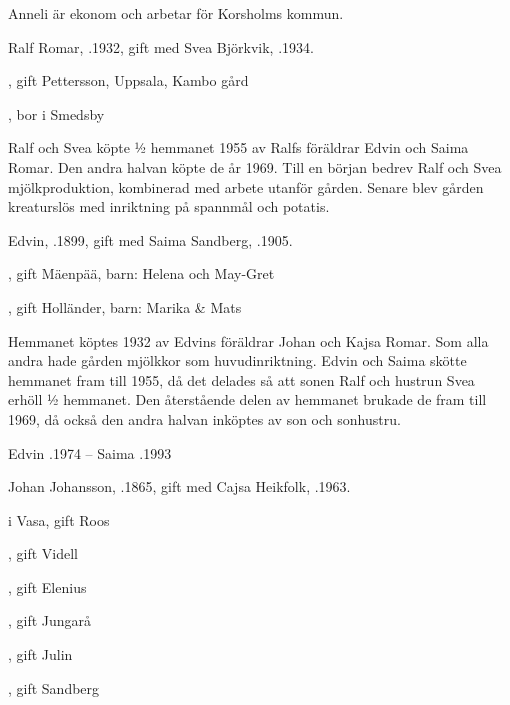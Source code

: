 Anneli är  ekonom och arbetar för Korsholms kommun.





Ralf Romar, .1932, gift med Svea Björkvik, .1934.
\begin{jhchildren}
  \item {}, gift Pettersson, Uppsala, Kambo gård
  \item {}, bor i Smedsby
\end{jhchildren}

Ralf och Svea köpte  ½ hemmanet 1955 av Ralfs föräldrar Edvin och Saima Romar. Den andra halvan köpte de  år 1969. Till en början bedrev Ralf och Svea mjölkproduktion, kombinerad med arbete utanför gården. Senare blev gården kreaturslös med inriktning på spannmål och potatis.



Edvin, .1899, gift med Saima Sandberg, .1905.
\begin{jhchildren}
  \item {}, gift Mäenpää, barn: Helena och May-Gret
  \item {}
  \item {}, gift Holländer, barn: Marika \& Mats
\end{jhchildren}

Hemmanet köptes  1932  av Edvins föräldrar Johan och Kajsa Romar. Som alla andra hade gården mjölkkor som huvudinriktning. Edvin och Saima skötte hemmanet fram till 1955, då det delades så att sonen Ralf och hustrun Svea erhöll ½ hemmanet.  Den återstående delen av hemmanet brukade de fram till 1969, då också den andra halvan inköptes av son och sonhustru.

Edvin .1974  --  Saima .1993



Johan Johansson, .1865, gift med Cajsa Heikfolk, .1963.
\begin{jhchildren}
  \item {} i Vasa, gift Roos
  \item {}, gift Videll
  \item {}, gift Elenius
  \item {}, gift Jungarå
  \item {}
  \item {}, gift Julin
  \item {}, gift Sandberg
\end{jhchildren}

